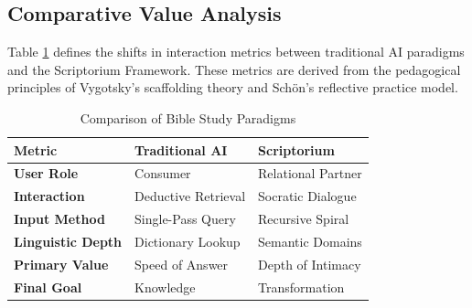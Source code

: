 \subsection{Comparative Value Analysis}
Table \ref{tab:comparison} defines the shifts in interaction metrics between traditional AI paradigms and the Scriptorium Framework. These metrics are derived from the pedagogical principles of Vygotsky's \cite{vygotsky1978} scaffolding theory and Sch\"{o}n's \cite{schon1983} reflective practice model.

\begin{table}[h]
\caption{Comparison of Bible Study Paradigms}
\label{tab:comparison}
\centering
\begin{tabular}{@{}lll@{}}
\toprule
\textbf{Metric} & \textbf{Traditional AI} & \textbf{Scriptorium} \\ \midrule
\textbf{User Role} & Consumer & Relational Partner \\ \midrule
\textbf{Interaction} & Deductive Retrieval & Socratic Dialogue \\ \midrule
\textbf{Input Method} & Single-Pass Query & Recursive Spiral \\ \midrule
\textbf{Linguistic Depth} & Dictionary Lookup & Semantic Domains \\ \midrule
\textbf{Primary Value} & Speed of Answer & Depth of Intimacy \\ \midrule
\textbf{Final Goal} & Knowledge & Transformation \\ \bottomrule
\end{tabular}
\end{table}
